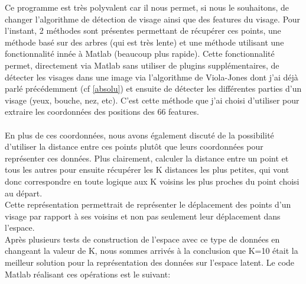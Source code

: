 \documentclass[poster]{polytech/polytech}
\begin{document}
Ce programme est très polyvalent car il nous permet, si nous le souhaitons, de changer l'algorithme de détection de visage ainsi que des features du visage. Pour l'instant, 2 méthodes sont présentes permettant de récupérer ces points, une méthode basé sur des arbres (qui est très lente) et une méthode utilisant une fonctionnalité innée à Matlab (beaucoup plus rapide). Cette fonctionnalité permet, directement via Matlab sans utiliser de plugins supplémentaires, de détecter les visages dans une image via l'algorithme de Viola-Jones dont j'ai déjà parlé précédemment (cf \autoref{absolu}) et ensuite de détecter les différentes parties d'un visage (yeux, bouche, nez, etc). C'est cette méthode que j'ai choisi d'utiliser pour extraire les coordonnées des positions des 66 features.\\
\\
En plus de ces coordonnées, nous avons également discuté de la possibilité d'utiliser la distance entre ces points plutôt que leurs coordonnées pour représenter ces données. Plus clairement, calculer la distance entre un point et tous les autres pour ensuite récupérer les K distances les plus petites, qui vont donc correspondre en toute logique aux K voisins les plus proches du point choisi au départ.\\
Cette représentation permettrait de représenter le déplacement des points d'un visage par rapport à ses voisins et non pas seulement leur déplacement dans l'espace.\\
Après plusieurs tests de construction de l'espace avec ce type de données en changeant la valeur de K, nous sommes arrivés à la conclusion que K=10 était la meilleur solution pour la représentation des données sur l'espace latent.
\newpage
Le code Matlab réalisant ces opérations est le suivant: 
\end{document}
